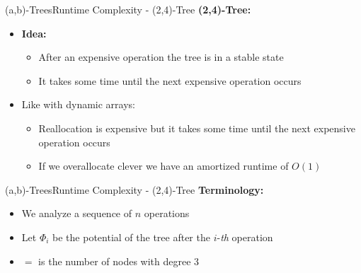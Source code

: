 
\begin{frame}{(a,b)-Trees}{Runtime Complexity - (2,4)-Tree}
  \textbf{(2,4)-Tree:}
  \begin{itemize}
    \item<2->
      \textbf{Idea:}
      \begin{itemize}
        \item<3->
          After an expensive operation the tree is in a stable state
        \item<4->
          It takes some time until the next expensive operation occurs
      \end{itemize}
    \item<5->
      Like with dynamic arrays:
      \begin{itemize}
        \item<6->
          {\color{Mittel-Blau}Reallocation} is expensive but it takes some time
          until the next expensive operation occurs
        \item<7->
          If we {\color{Mittel-Blau}overallocate} clever we have an amortized
          runtime of {\color{Mittel-Blau}$O(1)$}
      \end{itemize}
  \end{itemize}
\end{frame}


\begin{frame}{(a,b)-Trees}{Runtime Complexity - (2,4)-Tree}
  \textbf{Terminology:}
  \begin{itemize}
    \item<2->
      We analyze a sequence of {\color{Mittel-Blau}$n$} operations
    \item<3->
      Let {\color{Mittel-Blau}$\Phi_i$} be the potential of the tree after
      the {\color{Mittel-Blau}$i$}-\textit{th} operation
    \item<4->
      $=$ is the number of nodes
      with {\color{Mittel-Blau}degree 3}
  \end{itemize}
\end{frame}


